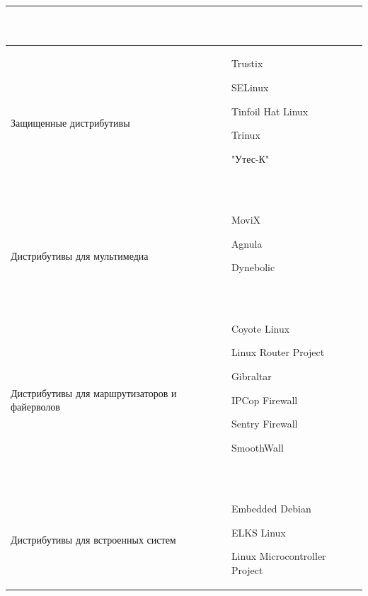 \documentclass[bachelor, och, referat, times]{SCWorks}
\begin{document}
\begin{longtable}{|p{}|
p{}|}
\begin{minipage}{\textwidth}
\begin{list}{•}{~}
        \end{list}
        ~
    \end{minipage}
    \\\hline
    Защищенные дистрибутивы &
    \begin{minipage}{\textwidth}
        \begin{list}{•}{~}
            \item Trustix
            \item SELinux
            \item Tinfoil Hat Linux
            \item Trinux
            \item "Утес-К"
        \end{list}
        ~
    \end{minipage}
    \\\hline
    Дистрибутивы для мультимедиа &
    \begin{minipage}{\textwidth}
        \begin{list}{•}{~}
            \item MoviX
            \item Agnula
            \item Dynebolic
        \end{list}
        ~
    \end{minipage}
    \\\hline
    Дистрибутивы для маршрутизаторов и файерволов &
    \begin{minipage}{\textwidth}
        \begin{list}{•}{~}
            \item Coyote Linux
            \item Linux Router Project
            \item Gibraltar
            \item IPCop Firewall
            \item Sentry Firewall
            \item SmoothWall
        \end{list}
        ~
    \end{minipage}
    \\\hline
    Дистрибутивы для встроенных систем &
    \begin{minipage}{\textwidth}
        \begin{list}{•}{~}
            \item Embedded Debian
            \item ELKS Linux
            \item Linux Microcontroller Project

\end{list}
\end{minipage}
\end{longtable}
\end{document}
